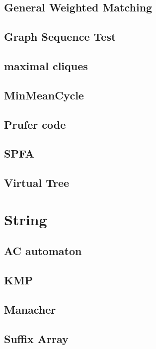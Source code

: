 \subsection{General Weighted Matching}

\subsection{Graph Sequence Test}

\subsection{maximal cliques}

\subsection{MinMeanCycle}

\subsection{Prufer code}

\subsection{SPFA}

\subsection{Virtual Tree}


\section{String}
\subsection{AC automaton}

\subsection{KMP}

\subsection{Manacher}

\subsection{Suffix Array}

